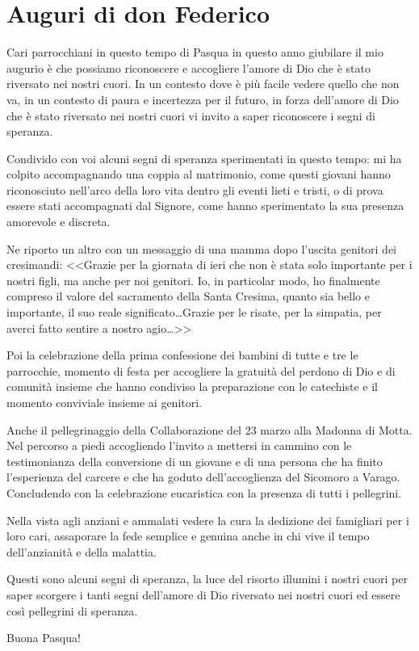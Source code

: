 \section{Auguri di don Federico}

Cari parrocchiani in questo tempo di Pasqua in questo anno giubilare il mio augurio è che possiamo riconoscere e accogliere l'amore di Dio che è stato riversato nei nostri cuori. In un contesto dove è più facile vedere quello che non va, in un contesto di paura e incertezza per il futuro, in forza dell'amore di Dio che è stato riversato nei nostri cuori vi invito a saper riconoscere i segni di speranza.

Condivido con voi alcuni segni di speranza sperimentati in questo tempo: mi ha colpito accompagnando una coppia al matrimonio, come questi giovani hanno riconosciuto nell'arco della loro vita dentro gli eventi lieti e tristi, o di prova essere stati accompagnati dal Signore, come hanno sperimentato la sua presenza amorevole e discreta.

Ne riporto un altro con un messaggio di una mamma dopo l'uscita genitori dei cresimandi: <<Grazie per la giornata di ieri che non è stata solo importante per i nostri figli, ma anche per noi genitori. Io, in particolar modo, ho finalmente compreso il valore del sacramento della Santa Cresima, quanto sia bello e importante, il suo reale significato\ldots Grazie per le risate, per la simpatia, per averci fatto sentire a nostro agio\ldots>>

Poi la celebrazione della prima confessione dei bambini di tutte e tre le parrocchie, momento di festa per accogliere la gratuità del perdono di Dio e di comunità insieme che hanno condiviso la preparazione con le catechiste e il momento conviviale insieme ai genitori.

Anche il pellegrinaggio della Collaborazione del 23 marzo alla Madonna di Motta. Nel percorso a piedi accogliendo l'invito a mettersi in cammino con le testimonianza della conversione di un giovane e di una persona che ha finito l'esperienza del carcere e che ha goduto dell'accoglienza del Sicomoro a Varago. Concludendo con la celebrazione eucaristica con la presenza di tutti i pellegrini.

Nella vista agli anziani e ammalati vedere la cura la dedizione dei famigliari per i loro cari, assaporare la fede semplice e genuina anche in chi vive il tempo dell'anzianità e della malattia.

Questi sono alcuni segni di speranza, la luce del risorto illumini i nostri cuori per saper scorgere i tanti segni dell'amore di Dio riversato nei nostri cuori ed essere così pellegrini di speranza.

Buona Pasqua!


